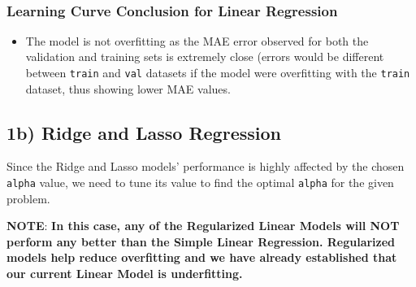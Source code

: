 \documentclass[11pt]{article}
\providecommand{\tightlist}{%
      \setlength{\itemsep}{0pt}\setlength{\parskip}{0pt}}
\begin{document}
    \begin{center}
    \end{center}
    { \hspace*{\fill} \\}
    
    \hypertarget{learning-curve-conclusion-for-linear-regression}{%
\subsubsection{Learning Curve Conclusion for Linear
Regression}\label{learning-curve-conclusion-for-linear-regression}}

\begin{itemize}
\tightlist
\item
  The model is not overfitting as the MAE error observed for both the
  validation and training sets is extremely close (errors would be
  different between \texttt{train} and \texttt{val} datasets if the
  model were overfitting with the \texttt{train} dataset, thus showing
  lower MAE values.
\end{itemize}

    \hypertarget{b-ridge-and-lasso-regression}{%
\subsection{1b) Ridge and Lasso
Regression}\label{b-ridge-and-lasso-regression}}

Since the Ridge and Lasso models' performance is highly affected by the
chosen \texttt{alpha} value, we need to tune its value to find the
optimal \texttt{alpha} for the given problem.

\textbf{NOTE}: \textbf{In this case, any of the Regularized Linear
Models will NOT perform any better than the Simple Linear Regression.
Regularized models help reduce overfitting and we have already
established that our current Linear Model is underfitting.}
\end{document}
